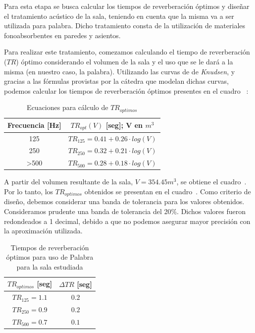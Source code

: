 \par Para esta etapa se busca calcular los tiempos de reverberación óptimos y diseñar el tratamiento acústico de la sala, teniendo en cuenta que la misma va a ser utilizada para palabra. Dicho tratamiento consta de la utilización de materiales fonoabsorbentes en paredes y asientos.\\

\par Para realizar este tratamiento, comezamos calculando el tiempo de reverberación ($TR$) óptimo considerando el volumen de la sala y el uso que se le dará a la misma (en nuestro caso, la palabra). Utilizando las curvas de  de \textit{Knudsen}, y gracias a las fórmulas provistas por la cátedra que modelan dichas curvas, podemos calcular los tiempos de reverberación óptimos presentes en el cuadro~ :

\begin{table}[h]
    \centering
    \begin{tabular}{|c|c|} \hline
        \textbf{Frecuencia [Hz]}  & \textbf{$TR_{opt}(V)$ [seg]}; V en $m^3$\\ \hline
        125 & $TR_{125} = 0.41 + 0.26 \cdot log(V)$ \\ \hline
        250 & $TR_{250} = 0.32 + 0.21 \cdot log(V)$ \\ \hline
        >500 & $TR_{500} = 0.28 + 0.18 \cdot log(V)$ \\ \hline
    \end{tabular}
    \caption{Ecuaciones para cálculo de $TR_{optimos}$}
    \label{tab:ecuaciones_caluclo_TRoptimo}
\end{table}

\par A partir del volumen resultante de la sala, $V = 354.45 m^3$, se obtiene el cuadro~. Por lo tanto, los $TR_{optimos}$ obtenidos se presentan en el cuadro~. Como criterio de diseño, debemos considerar una banda de tolerancia para los valores obtenidos. Consideramos prudente una banda de tolerancia del 20\%. Dichos valores fueron redondeados a 1 decimal, debido a que no podemos asegurar mayor precisión con la aproximación utilizada.

\begin{table}[h]
    \centering
    \begin{tabular}{|c|c|} \hline
         $TR_{optimos}$ [seg] & $\Delta TR$ [seg] \\ \hline 
         $TR_{125} = 1.1$  & $0.2$ \\ \hline
         $TR_{250} = 0.9$  & $0.2$\\ \hline
         $TR_{500} = 0.7$  & $0.1$ \\ \hline
    \end{tabular}
    \caption{Tiempos de reverberación óptimos para uso de Palabra para la sala estudiada}
    \label{tab:TRoptimos_de_sala}
\end{table}

